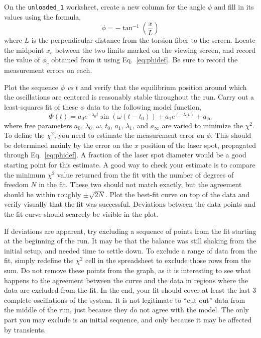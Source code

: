 \documentclass{revtex4}
\begin{document}
On the {\tt unloaded\_1} worksheet, create a new column for the angle
$\phi$ and fill in its values using the formula,
\begin{equation}
\phi=-\tan^{-1}\left(\frac{x}{L}\right)
\label{eq:phidef}
\end{equation}
where $L$ is the perpendicular distance from the torsion fiber to the
screen.  Locate the midpoint $x_c$ between the two limits marked on the
viewing screen, and record the value of $\phi_c$ obtained from it using
Eq.~\ref{eq:phidef}.  Be sure to record the measurement errors on each.

Plot the sequence $\phi$ {\em vs} $t$ and verify that the
equilibrium position around which the oscillations are centered is
reasonably stable throughout the run.  Carry out a least-squares fit
of these $\phi$ data to the following model function,
\begin{equation}
\Phi(t) = a_0 e^{-\lambda_0 t}\sin(\omega(t-t_0)) + a_1 e^(-\lambda_1 t)
+a_{\infty}
\label{eq:fitfunc}
\end{equation}
where free parameters $a_0$, $\lambda_0$, $\omega$, $t_0$, $a_1$, $\lambda_1$,
and $a_{\infty}$ are varied to minimize the $\chi^2$.  To define the $\chi^2$,
you need to estimate the measurement error on $\phi$.  This should be
determined mainly by the error on the $x$ position of the laser spot,
propagated through Eq.~\ref{eq:phidef}.  A fraction of the laser spot
diameter would be a good starting point for this estimate.  A good way
to check your estimate is to compare the minimum $\chi^2$ value returned
from the fit with the number of degrees of freedom $N$ in the fit.  These
two should not match exactly, but the agreement should be within roughly
$\pm\sqrt{2N}$.  Plot the best-fit curve on top of the data and verify visually 
that the fit was successful.  Deviations between the data points and the
fit curve should scarcely be visible in the plot.

If deviations are apparent, try excluding a sequence of points from the
fit starting at the beginning of the run.  It may be that the balance was
still shaking from the initial setup, and needed time to settle down.
To exclude a range of data from the fit, simply redefine the $\chi^2$ cell
in the spreadsheet to exclude those rows from the sum. Do not remove these
points from the graph, as it is interesting to see what happens to the
agreement between the curve and the data in regions where the data are
excluded from the fit.  In the end, your fit should cover at least the
last 3 complete oscillations of the system.  It is not legitimate to
``cut out'' data from the middle of the run, just because they do not
agree with the model.  The only part you may exclude is an initial sequence,
and only because it may be affected by transients.
\end{document}

